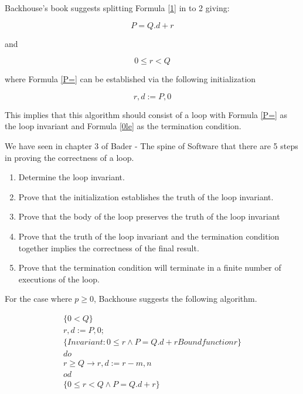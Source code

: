 \documentclass[10pt,a4paper]{article}
\begin{document}
Backhouse's book suggests splitting Formula \ref{1} in to 2 giving:

\begin{equation}
\label{P=}
 P = Q.d +r
\end{equation}

and

\begin{equation}
\label{0le}
 0\le r < Q 
\end{equation}

where Formula \ref{P=} can be established via the following initialization

\begin{equation}
 r,d:=P,0
\end{equation}

This implies that this algorithm should consist of a loop with Formula \ref{P=} as the loop invariant and Formula \ref{0le} as the termination condition.

We have seen in chapter 3 of Bader - The spine of Software that there are 5 steps in proving the correctness of a loop.
\begin{enumerate}
\item Determine the loop invariant.
\item Prove that the initialization establishes the truth of the loop invariant.
\item Prove that the body of the loop preserves the truth of the loop invariant
\item Prove that the truth of the loop invariant and the termination condition together implies the correctness of the final result.
\item Prove that the termination condition will terminate in a finite number of executions of the loop.
\end{enumerate}

For the case where $p\ge 0$, Backhouse suggests the following algorithm.

\begin{equation}
 \begin{split}
 \{0<Q\} \\
 r,d:=P,0;\\
 \{Invariant: 0 \le r \wedge P = Q.d +r Bound function r \} \\
 do \\
 r \ge Q \rightarrow r,d := r-m,n \\
 od\\
 \{0\le r<Q\wedge P=Q.d+r\}
 \end{split}
\end{equation}
\end{document}
